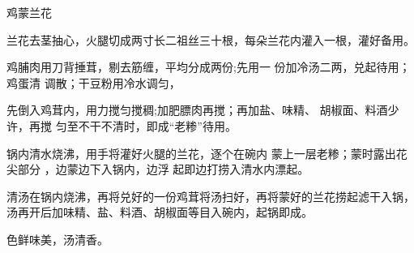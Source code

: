 \begin{recipe}{鸡蒙兰花}

\ingredients


\preparation

\step 兰花去茎抽心，火腿切成两寸长二祖丝三十根，每朵兰花内灌入一根，灌好备用。

鸡脯肉用刀背捶茸，剔去筋缠，平均分成两份;先用一 份加冷汤二两，兑起待用；鸡蛋清
调散；干豆粉用冷水调匀，

先倒入鸡茸内，用力搅匀搅稠;加肥膘肉再搅；再加盐、味精、 胡椒面、料酒少许，再搅
匀至不干不清时，即成“老糁”待用。

锅内清水烧沸，用手将灌好火腿的兰花，逐个在碗内 蒙上一层老糁；蒙时露出花尖部分
，边蒙边下入锅内，边浮 起即边打捞入清水内漂起。

\step 清汤在锅内烧沸，再将兑好的一份鸡茸将汤扫好，再将蒙好的兰花捞起滤干入锅，
汤再开后加味精、盐、料酒、胡椒面等目入碗内，起锅即成。

\features

色鲜味美，汤清香。

\end{recipe}

